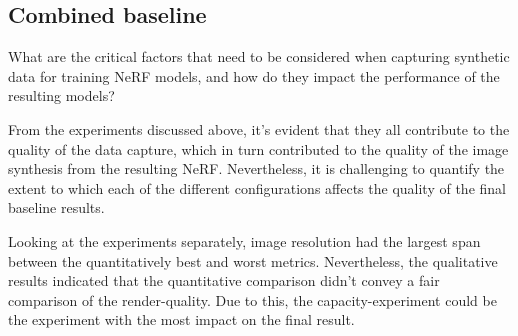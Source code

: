 























\subsection{Combined baseline}
\begin{description}[leftmargin=!,labelwidth=\widthof{RQ 1:}]
\item[\textbf{RQ 1:}] What are the critical factors that need to be considered when capturing synthetic data for training NeRF models, and how do they impact the performance of the resulting models?
\end{description}


From the experiments discussed above, it's evident that they all contribute to the quality of the data capture, which in turn contributed to the quality of the image synthesis from the resulting NeRF. Nevertheless, it is challenging to quantify the extent to which each of the different configurations affects the quality of the final baseline results.

Looking at the experiments separately, image resolution had the largest span between the quantitatively best and worst metrics. Nevertheless, the qualitative results indicated that the quantitative comparison didn't convey a fair comparison of the render-quality. Due to this, the capacity-experiment could be the experiment with the most impact on the final result.

